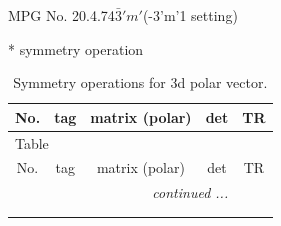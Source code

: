 \documentclass[fleqn,8pt]{jsarticle}
\begin{document}
\setcounter{MaxMatrixCols}{32}

\renewcommand{\tablename}{Table~}
\renewcommand{\figurename}{Figure~}
\begin{center}
\LARGE
MPG No. 20.4.74\quad$\bar{3}'m'$\quad(-3'm'1 setting)
\end{center}
* symmetry operation
\renewcommand{\arraystretch}{1.3}
\begin{longtable}{ccccc}
\caption{Symmetry operations for 3d polar vector.}
 \\
 \hline \hline
No. & tag & matrix (polar) & det & TR \\ \hline \endfirsthead

\multicolumn{4}{l}{\tablename\ \thetable{}} \\
 \hline \hline
No. & tag & matrix (polar) & det & TR \\ \hline \endhead

 \hline \hline
\multicolumn{4}{r}{\footnotesize\it continued ...} \\ \endfoot

 \hline \hline
\multicolumn{4}{r}{} \\ \endlastfoot


\end{longtable}
\end{document}
